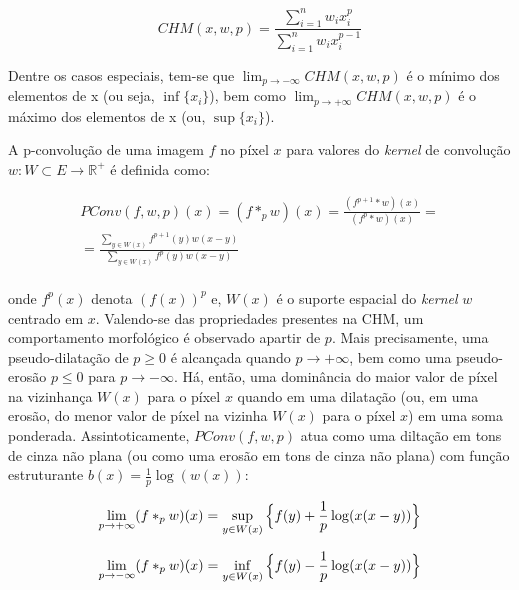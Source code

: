 \begin{equation}
    CHM(x, w, p) = \frac{\sum_{i = 1}^{n} w_{i}x_{i}^{p}}{\sum_{i = 1}^{n} w_{i}x_{i}^{p-1}}
    \label{eq:equation4}
\end{equation}

Dentre os casos especiais, tem-se que $\lim_{p \to -\infty} CHM(x, w, p)$ é o mínimo dos elementos de x (ou seja, $\inf\{x_{i}\}$), bem como $\lim_{p \to +\infty} CHM(x, w, p)$ é o máximo dos elementos de x (ou, $\sup\{x_{i}\}$).

A p-convolução de uma imagem $f$ no píxel $x$ para valores do \emph{kernel} de convolução $w: W \subset E \to \mathbb{R}^{+}$ é definida como:

\begin{equation}
    \begin{split}
        PConv(f, w, p)(x) = (f *_{p} w)(x) = \frac{(f^{p+1}*w)(x)}{(f^{p}*w)(x)} = \\
        = \frac{\sum_{y \in W(x)} f^{p+1}(y)w(x - y)}{\sum_{y \in W(x)} f^{p}(y)w(x - y)}
    \end{split}
    \label{eq:equation5}
\end{equation}
\\
onde $f^{p}(x)$ denota $(f(x))^{p}$ e, $W(x)$ é o suporte espacial do \emph{kernel} $w$ centrado em $x$.
Valendo-se das propriedades presentes na CHM, um comportamento morfológico é observado apartir de $p$.
Mais precisamente, uma pseudo-dilatação de $p \geq 0$ é alcançada quando $p \to +\infty$, bem como uma pseudo-erosão $p \leq 0$ para $p \to -\infty$.
Há, então, uma dominância do maior valor de píxel na vizinhança $W(x)$ para o píxel $x$ quando em uma dilatação (ou, em uma erosão, do menor valor de píxel na vizinha $W(x)$ para o píxel $x$) em uma soma ponderada.
Assintoticamente, $PConv(f, w, p)$ atua como uma diltação em tons de cinza não plana (ou como uma erosão em tons de cinza não plana) com função estruturante $b(x) = \frac{1}{p}\log(w(x))$:

\begin{equation}
    \lim_{p \to +\infty} (f *_{p} w)(x) =
    \sup_{y \in W(x)} \Big{\{}f(y) + \frac{1}{p}\log(x(x - y))\Big{\}}
    \label{eq:equation6}
\end{equation}

\begin{equation}
    \lim_{p \to -\infty} (f *_{p} w)(x) =
    \inf_{y \in W(x)} \Big{\{}f(y) - \frac{1}{p}\log(x(x - y))\Big{\}}
    \label{eq:equation7}
\end{equation}

